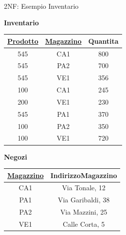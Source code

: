%
\begin{frame}{2NF: Esempio Inventario}
\vspace{-1.5cm}
\begin{minipage}[t]{0.48\linewidth}
    \begin{center}
        \textbf{Inventario}
        
        \begin{tabular}{|c|c|c|}
        \hline
        \rowcolor{cyan!30} \underline{Prodotto} & \underline{Magazzino} & Quantita \\
        \hline
        545 & CA1 & 800 \\ \hline
        545 & PA2 & 700 \\ \hline
        545 & VE1 & 356 \\ \hline
        100 & CA1 & 245 \\ \hline
        200 & VE1 & 230 \\ \hline
        545 & PA1 & 370 \\ \hline
        100 & PA2 & 350 \\ \hline
        100 & VE1 & 720 \\ \hline
    \end{tabular}
    \end{center}
\end{minipage}%
\hfill%
\begin{minipage}[t]{0.5\linewidth}
    \begin{center}
        \textbf{Negozi}

        \begin{tabular}{|c|c|}
        \hline
        \rowcolor{cyan!30} \underline{Magazzino} & IndirizzoMagazzino \\
        \hline
        CA1 & Via Tonale, 12 \\ \hline
        PA1 & Via Garibaldi, 38 \\ \hline
        PA2 & Via Mazzini, 25 \\ \hline
        VE1 & Calle Corta, 5 \\ \hline
    \end{tabular}
    \end{center}
\end{minipage}
\end{frame}
